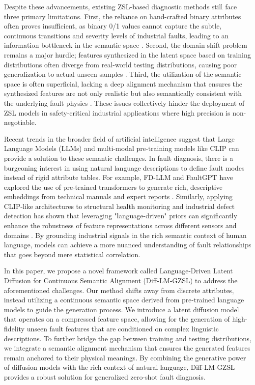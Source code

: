 Despite these advancements, existing ZSL-based diagnostic methods still face three primary limitations. First, the reliance on hand-crafted binary attributes often proves insufficient, as binary 0/1 values cannot capture the subtle, continuous transitions and severity levels of industrial faults, leading to an information bottleneck in the semantic space \cite{Akata2015}. Second, the domain shift problem remains a major hurdle; features synthesized in the latent space based on training distributions often diverge from real-world testing distributions, causing poor generalization to actual unseen samples \cite{Fu2015}. Third, the utilization of the semantic space is often superficial, lacking a deep alignment mechanism that ensures the synthesized features are not only realistic but also semantically consistent with the underlying fault physics \cite{Zhu2019}. These issues collectively hinder the deployment of ZSL models in safety-critical industrial applications where high precision is non-negotiable.

Recent trends in the broader field of artificial intelligence suggest that Large Language Models (LLMs) and multi-modal pre-training models like CLIP can provide a solution to these semantic challenges. In fault diagnosis, there is a burgeoning interest in using natural language descriptions to define fault modes instead of rigid attribute tables. For example, FD-LLM and FaultGPT have explored the use of pre-trained transformers to generate rich, descriptive embeddings from technical manuals and expert reports \cite{Brown2020, Radford2021}. Similarly, applying CLIP-like architectures to structural health monitoring and industrial defect detection has shown that leveraging "language-driven" priors can significantly enhance the robustness of feature representations across different sensors and domains \cite{Li2023a, Wang2023b}. By grounding industrial signals in the rich semantic context of human language, models can achieve a more nuanced understanding of fault relationships that goes beyond mere statistical correlation.

In this paper, we propose a novel framework called Language-Driven Latent Diffusion for Continuous Semantic Alignment (Diff-LM-GZSL) to address the aforementioned challenges. Our method shifts away from discrete attributes, instead utilizing a continuous semantic space derived from pre-trained language models to guide the generation process. We introduce a latent diffusion model that operates on a compressed feature space, allowing for the generation of high-fidelity unseen fault features that are conditioned on complex linguistic descriptions. To further bridge the gap between training and testing distributions, we integrate a semantic alignment mechanism that ensures the generated features remain anchored to their physical meanings. By combining the generative power of diffusion models with the rich context of natural language, Diff-LM-GZSL provides a robust solution for generalized zero-shot fault diagnosis.

